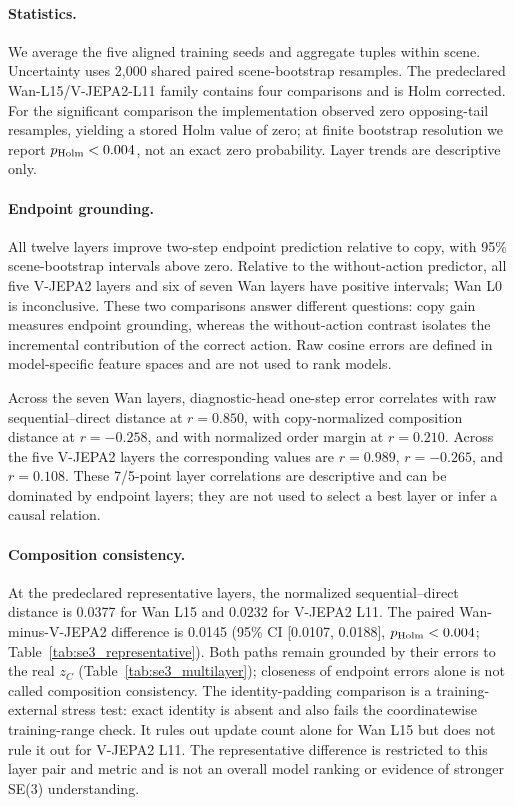 \paragraph{Statistics.}
We average the five aligned training seeds and aggregate tuples within scene.  Uncertainty uses 2,000 shared paired scene-bootstrap resamples.  The predeclared Wan-L15/V-JEPA2-L11 family contains four comparisons and is Holm corrected.  For the significant comparison the implementation observed zero opposing-tail resamples, yielding a stored Holm value of zero; at finite bootstrap resolution we report $p_{\rm Holm}<0.004$, not an exact zero probability.  Layer trends are descriptive only.



\paragraph{Endpoint grounding.}
All twelve layers improve two-step endpoint prediction relative to copy, with 95\% scene-bootstrap intervals above zero.  Relative to the without-action predictor, all five V-JEPA2 layers and six of seven Wan layers have positive intervals; Wan L0 is inconclusive.  These two comparisons answer different questions: copy gain measures endpoint grounding, whereas the without-action contrast isolates the incremental contribution of the correct action.  Raw cosine errors are defined in model-specific feature spaces and are not used to rank models.

Across the seven Wan layers, diagnostic-head one-step error correlates with raw sequential--direct distance at $r=0.850$, with copy-normalized composition distance at $r=-0.258$, and with normalized order margin at $r=0.210$.  Across the five V-JEPA2 layers the corresponding values are $r=0.989$, $r=-0.265$, and $r=0.108$.  These 7/5-point layer correlations are descriptive and can be dominated by endpoint layers; they are not used to select a best layer or infer a causal relation.

\paragraph{Composition consistency.}
At the predeclared representative layers, the normalized sequential--direct distance is 0.0377 for Wan L15 and 0.0232 for V-JEPA2 L11.  The paired Wan-minus-V-JEPA2 difference is 0.0145 (95\% CI [0.0107, 0.0188], $p_{\rm Holm}<0.004$; Table~\ref{tab:se3_representative}).  Both paths remain grounded by their errors to the real $z_C$ (Table~\ref{tab:se3_multilayer}); closeness of endpoint errors alone is not called composition consistency.  The identity-padding comparison is a training-external stress test: exact identity is absent and also fails the coordinatewise training-range check.  It rules out update count alone for Wan L15 but does not rule it out for V-JEPA2 L11.  The representative difference is restricted to this layer pair and metric and is not an overall model ranking or evidence of stronger SE(3) understanding.

